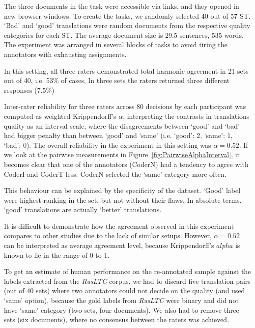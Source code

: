
The three documents in the task were accessible via links, and they opened in new browser windows.
To create the tasks, we randomly selected 40 out of 57 ST. `Bad' and `good' translations were random documents from the respective quality categories for each ST. The average document size is 29.5 sentences, 535 words.  
The experiment was arranged in several blocks of tasks to avoid tiring the annotators with exhausting assignments. 

In this setting, all three raters demonstrated total harmonic agreement in 21 sets out of 40, i.e. 53\% of cases. In three sets the raters returned three different responses (7.5\%)

Inter-rater reliability for three raters across 80 decisions by each participant was computed as weighted Krippendorff's $\alpha$, interpreting the contrasts in translations quality as an interval scale, where the disagreements between `good' and `bad' had bigger penalty than between `good' and `same' (i.e. `good': 2, `same': 1, `bad': 0). The overall reliability in the experiment in this setting was $\alpha=0.52$.
If we look at the pairwise measurements in Figure~\ref{fig:PairwiseAlphaInterval}, it becomes clear that one of the annotators (CoderN) had a tendency to agree with CoderI and CoderT less. CoderN selected  the `same' category more often. 
\vspace{-2em}

This behaviour can be explained by the specificity of the dataset. `Good' label were highest-ranking in the set, but not without their flaws. In absolute terms, `good' translations are actually `better' translations.

It is difficult to demonstrate how the agreement observed in this experiment compares to other studies due to the lack of similar setups. However, $\alpha=0.52$ can be interpreted as average agreement level, because Krippendorff's $alpha$ is known to lie in the range of 0 to 1. 

To get an estimate of human performance on the re-annotated sample against the labels extracted from the \textit{RusLTC} corpus, we had to discard five translation pairs (out of 40 sets) where two annotators could not decide on the quality (and used `same' option), because the gold labels from \textit{RusLTC} were binary and did not have `same' category (two sets, four documents). We also had to remove three sets (six documents), where no consensus between the raters was achieved. 

